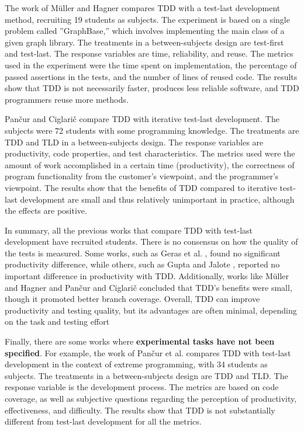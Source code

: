 The work of Müller and Hagner \cite{Muller2002} compares TDD with a test-last development method, recruiting 19 students as subjects. The experiment is based on a single problem called ''GraphBase,'' which involves implementing the main class of a given graph library. The treatments in a between-subjects design are test-first and test-last. The response variables are time, reliability, and reuse. The metrics used in the experiment were the time spent on implementation, the percentage of passed assertions in the tests, and the number of lines of reused code. The results show that TDD is not necessarily faster, produces less reliable software, and TDD programmers reuse more methods.

Pan\v cur and Ciglari\v c \cite{Pancur2011} compare TDD with iterative test-last development. The subjects were 72 students with some programming knowledge.  The treatments are TDD and TLD in a between-subjects design. The response variables are productivity, code properties, and test characteristics. %
The metrics used were the amount of work accomplished in a certain time (productivity), the correctness of program functionality from the customer's viewpoint, and the programmer's viewpoint. The results show that the benefits of TDD compared to iterative test-last development are small and thus relatively unimportant in practice, although the effects are positive.%

In summary, all the previous works that compare TDD with test-last development have recruited students. There is no consensus on how the quality of the tests is measured. Some works, such as Geras et al. \cite{Geras2004}, found no significant productivity difference, while others, such as Gupta and Jalote \cite{Gupta2007}, reported no important difference in productivity with TDD. Additionally, works like Müller and Hagner \cite{Muller2002} and Pan\v{c}ur and Ciglari\v{c} \cite{Pancur2011} concluded that TDD’s benefits were small, though it promoted better branch coverage. Overall, TDD can improve productivity and testing quality, but its advantages are often minimal, depending on the task and testing effort


Finally, there are some works where \textbf{experimental tasks have not been specified}. For example, the work of Pan\v cur et al. \cite{Pancur2003} compares TDD with test-last development in the context of extreme programming, with 34 students as subjects. The treatments in a between-subjects design are TDD and TLD. The response variable is the development process. The metrics are based on code coverage, as well as subjective questions regarding the perception of productivity, effectiveness, and difficulty. The results show that TDD is not substantially different from test-last development for all the metrics.


